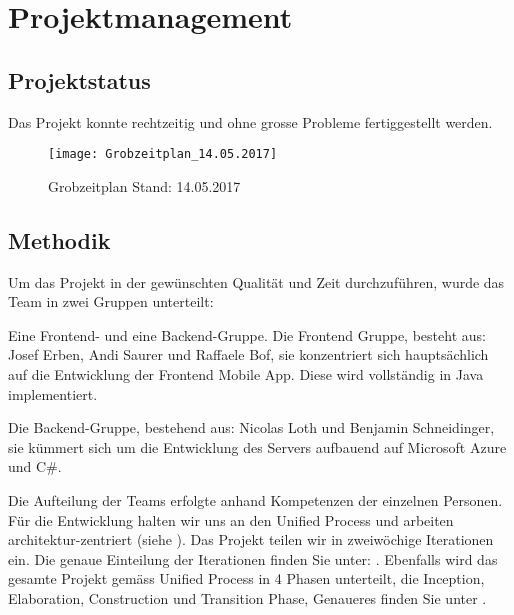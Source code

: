 \section{Projektmanagement}\label{projektmanagement}
\subsection{Projektstatus}\label{projektstatus}
Das Projekt konnte rechtzeitig und ohne grosse Probleme fertiggestellt werden.

\begin{figure}
  \centering
  \texttt{[image: Grobzeitplan\_14.05.2017]}
  \caption{Grobzeitplan Stand: 14.05.2017}
\end{figure}

\subsection{Methodik}
Um das Projekt in der gewünschten Qualität und Zeit durchzuführen, wurde das Team in zwei Gruppen unterteilt: 

Eine Frontend- und eine Backend-Gruppe. Die Frontend Gruppe, besteht aus: Josef Erben, Andi Saurer 
und Raffaele Bof, sie konzentriert sich hauptsächlich auf die Entwicklung der Frontend Mobile App. 
Diese wird vollständig in Java implementiert.

Die Backend-Gruppe, bestehend aus: Nicolas Loth und Benjamin Schneidinger, sie kümmert sich um die 
Entwicklung des Servers aufbauend auf Microsoft Azure und C\#.

Die Aufteilung der Teams erfolgte anhand Kompetenzen der einzelnen Personen.
Für die Entwicklung halten wir uns an den Unified Process und arbeiten architektur-zentriert 
(siehe ). Das Projekt teilen wir in zweiwöchige Iterationen ein. Die genaue 
Einteilung der Iterationen finden Sie unter: .
Ebenfalls wird das gesamte Projekt gemäss Unified Process in 4 Phasen unterteilt, die Inception, 
Elaboration, Construction und Transition Phase, Genaueres finden Sie unter .

